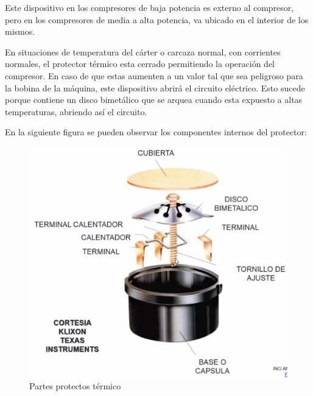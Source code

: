 Este dispositivo en los compresores de baja potencia es externo al compresor, pero en los compresores de media a alta potencia, va ubicado en el interior de los mismos. 

En situaciones de temperatura del c\'arter o carcaza normal, con corrientes normales, el protector t\'ermico esta cerrado permitiendo la operaci\'on del compresor. En caso de que estas aumenten a un valor tal que sea peligroso para la bobina de la m\'aquina, este dispositivo abrir\'a el circuito el\'ectrico. Esto sucede porque contiene un disco bimet\'alico que se arquea cuando esta expuesto a altas temperaturas, abriendo as\'i el circuito.

En la siguiente figura se pueden observar los componentes internos del protector:

\begin{figure}[H]
    \centering
    \includegraphics[width=.4\linewidth]{figuras/control-seguridad/partes-protector-termico.png}
    \caption{Partes protectos t\'ermico}
\end{figure}
